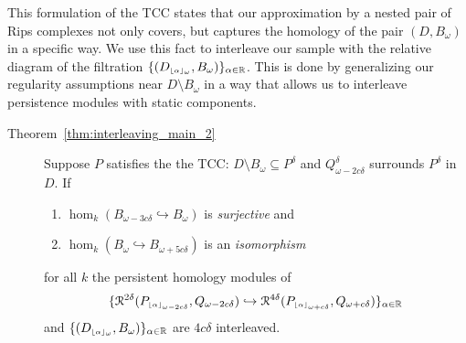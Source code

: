 This formulation of the TCC states that our approximation by a nested pair of Rips complexes not only covers, but captures the homology of the pair $(D,B_\omega)$ in a specific way.
We use this fact to interleave our sample with the relative diagram of the filtration $\{(D_{\scriptscriptstyle \lfloor\alpha\rfloor_{\omega}}, B_\omega)\}_{\alpha\in\mathbb{R}}$.
This is done by generalizing our regularity assumptions near $D\setminus B_\omega$ in a way that allows us to interleave persistence modules with static components.%


\begin{description}
  \item[Theorem~\ref{thm:interleaving_main_2}] Suppose $P$ satisfies the the TCC: $D\setminus B_\omega\subseteq P^\delta$ and  $Q_{\omega-2c\delta}^\delta$ surrounds $P^\delta$ in $D$.
    If
    \begin{enumerate}[label=\Roman*.]
      \item $\hom_k(B_{\omega-3c\delta}\hookrightarrow B_\omega)$ is \emph{surjective} and
      \item $\hom_k(B_\omega\hookrightarrow B_{\omega+5c\delta})$ is an \emph{isomorphism}
    \end{enumerate}
    for all $k$ the persistent homology modules of
    \[ \{\mathcal{R}^{2\delta}(P_{\scriptscriptstyle \lfloor\alpha\rfloor_{\omega-2c\delta}}, Q_{\omega-2c\delta})\hookrightarrow \mathcal{R}^{4\delta}(P_{\scriptscriptstyle \lfloor\alpha\rfloor_{\omega+c\delta}}, Q_{\omega+c\delta})\}_{\alpha\in\mathbb{R}}\]
    and $\{(D_{\scriptscriptstyle \lfloor\alpha\rfloor_{\omega}}, B_\omega)\}_{\alpha\in\mathbb{R}}$ are $4c\delta$ interleaved.
\end{description}

